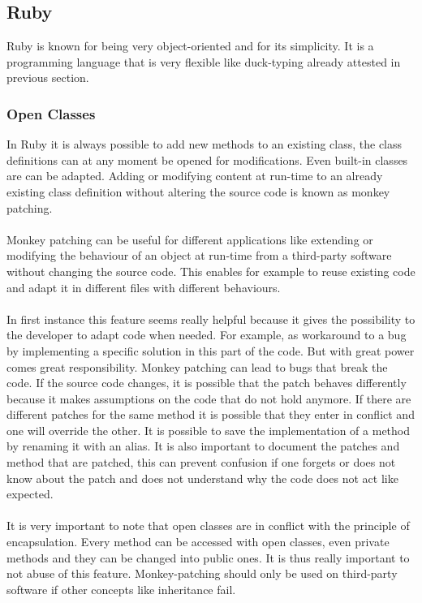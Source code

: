 \documentclass[12pt,a4paper,twocolumn]{article}
\begin{document}
\subsection{Ruby}
Ruby is known for being very object-oriented and for its simplicity. It is a programming language that is very flexible like duck-typing already attested in previous section.
\subsubsection{Open Classes}
In Ruby it is always possible to add new methods to an existing class, the class definitions can at any moment be opened for modifications. Even built-in classes are can be adapted. Adding or modifying content at run-time to an already existing class definition without altering the source code is known as monkey patching. %
\\
\\
Monkey patching can be useful for different applications like extending or modifying the behaviour of an object at run-time from a third-party software without changing the source code. This enables for example to reuse existing code and adapt it in different files with different behaviours.
\\
\\
In first instance this feature seems really helpful because it gives the possibility to the developer to adapt code when needed. For example, as workaround to a bug by implementing a specific solution in this part of the code. But with great power comes great responsibility. Monkey patching can lead to bugs that break the code. If the source code changes, it is possible that the patch behaves differently because it makes assumptions on the code that do not hold anymore. If there are different patches for the same method it is possible that they enter in conflict and one will override the other. It is possible to save the implementation of a method by renaming it with an alias. It is also important to document the patches and method that are patched, this can prevent confusion if one forgets or does not know about the patch and does not understand why the code does not act like expected.
\\
\\
It is very important to note that open classes are in conflict with the principle of encapsulation. Every method can be accessed with open classes, even private methods and they can  be changed into public ones. It is thus really important to not abuse of this feature. Monkey-patching should only be used on third-party software if other concepts like inheritance fail.
\end{document}
